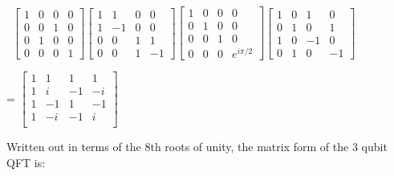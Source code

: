 \documentclass{article}
\begin{document}
\begin{frame}
\vspace{.5cm}

\begin{center}

\hbox{
$\begin{bmatrix}
    1 & 0  &0&0\\
    0&0&1&0\\
    0&1&0&0\\
    0&0&0&1 
\end{bmatrix}
\begin{bmatrix}
    1 & 1  &0&0\\
    1&-1&0&0\\
    0&0&1&1\\
    0&0&1&-1
\end{bmatrix}
\begin{bmatrix}
    1 & 0  &0&0\\
    0&1&0&0\\
    0&0&1&0\\
    0&0&0&e^{i\pi /2 } 
\end{bmatrix}
\begin{bmatrix}
    1 & 0  &1&0\\
    0& 1&0&1\\
    1&0&-1&0\\
    0&1&0&-1
\end{bmatrix}



$}
   
= $\begin{bmatrix}
           1 & 1 & 1 & 1 \\
           1 & i & -1 &-i \\
           1 & -1 & 1 & -1\\
           1 & -i & -1& i\\
       \end{bmatrix}$
 
\end{center}



    \begin{center}
    
Written out in terms of the $8$th roots of unity, the matrix form of the 3 qubit QFT is:



\end{center}
\end{frame}
\end{document}
